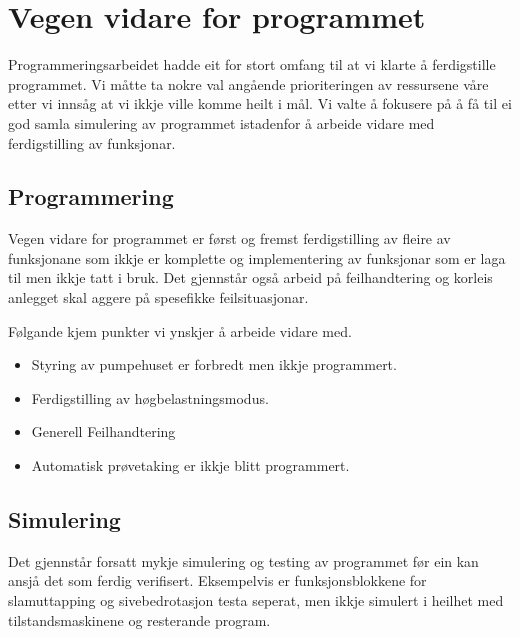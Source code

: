 \section{Vegen vidare for programmet}
\thispagestyle{fancy}

Programmeringsarbeidet hadde eit for stort omfang til at vi klarte å ferdigstille programmet. 
Vi måtte ta nokre val angående prioriteringen av ressursene våre etter vi innsåg at vi ikkje ville komme heilt i mål.
Vi valte å fokusere på å få til ei god samla simulering av programmet istadenfor å arbeide vidare med ferdigstilling av funksjonar.

\subsection{Programmering}

Vegen vidare for programmet er først og fremst ferdigstilling av fleire av funksjonane som ikkje er komplette og 
implementering av funksjonar som er laga til men ikkje tatt i bruk. 
Det gjennstår også arbeid på feilhandtering og korleis anlegget skal aggere på spesefikke feilsituasjonar.

Følgande kjem punkter vi ynskjer å arbeide vidare med.

\begin{itemize}
    \item Styring av pumpehuset er forbredt men ikkje programmert. 
    \item Ferdigstilling av høgbelastningsmodus.
    \item Generell Feilhandtering
    \item Automatisk prøvetaking er ikkje blitt programmert.
\end{itemize}


\subsection{Simulering}

Det gjennstår forsatt mykje simulering og testing av programmet før ein kan ansjå det som ferdig verifisert.
Eksempelvis er funksjonsblokkene for slamuttapping og sivebedrotasjon testa seperat, men ikkje simulert i heilhet med
tilstandsmaskinene og resterande program.

